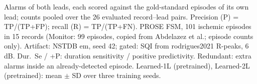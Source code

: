 \begin{table}[htbp]
\par\smallskip\footnotesize Alarms of both leads, each scored against the gold-standard episodes of its own lead; counts pooled over the 26 evaluated record--lead pairs. Precision (P) = TP/(TP+FP); recall (R) = TP/(TP+FN). PROSE FSM, 101 ischemic episodes in 15 records (Monitor: 99 episodes, copied from Abdelazez et al.; episode counts only). Artifact: NSTDB em, seed 42; gated: SQI from rodrigues2021 R-peaks, 6\,dB. Dur.\ Se / +P: duration sensitivity / positive predictivity. Redundant: extra alarms inside an already-detected episode. Learned-1L (pretrained), Learned-2L (pretrained): mean $\pm$ SD over three training seeds.
\end{table}
